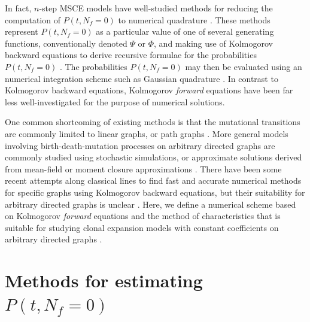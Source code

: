 \documentclass{article}
\begin{document}
In fact, $n$-step MSCE models have well-studied methods
for reducing the computation of $P(t,N_f = 0)$ to numerical quadrature
\cite{moolgavkar1992multistage,crump2005numerical,meza2008age,luebeck2013impact}.
These methods represent $P(t,N_f = 0)$ as a particular value of one of several generating functions, conventionally 
denoted $\Psi$ or $\Phi$, and making use of Kolmogorov backward equations to derive
recursive formulae for the probabilities $P(t,N_f = 0)$
\cite{crump2005numerical,moolgavkar1979two}. The probabilities $P(t,N_f = 0)$ may then
be evaluated using an numerical integration scheme such as Gaussian quadrature
\cite{luebeck2013impact}. In contrast to Kolmogorov backward equations, Kolmogorov \emph{forward} equations have been far less well-investigated for the purpose of numerical solutions.


One common shortcoming of existing methods is that the mutational transitions are 
commonly limited to linear graphs, or path graphs
\cite{luebeck2013impact,zhang2022waiting,zhang2022branching}. More general models involving
birth-death-mutation processes on arbitrary directed graphs are commonly
studied using stochastic simulations, or approximate solutions derived
from mean-field or moment closure approximations
\cite{patersonbozic2020colorectal,grima2010effective}. There have been some
recent attempts along classical lines to find fast and accurate numerical
methods for specific graphs
using Kolmogorov backward equations, but their suitability
for arbitrary directed graphs is unclear \cite{donotcite}.
Here, we define a numerical scheme based on Kolmogorov \emph{forward} equations
and the method of characteristics that is suitable for studying clonal expansion
models with constant coefficients on
arbitrary directed graphs \cite{crump2005numerical,quinn1989calculating}.

\section{Methods for estimating $P(t,N_f = 0)$}

\end{document}
